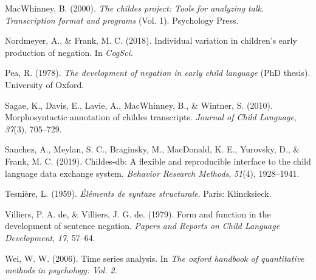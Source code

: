 \documentclass[10pt, letterpaper]{article}
\begin{document}
\leavevmode\hypertarget{ref-macwhinney2000childes}{}%
MacWhinney, B. (2000). \emph{The childes project: Tools for analyzing
talk. Transcription format and programs} (Vol. 1). Psychology Press.

\leavevmode\hypertarget{ref-nordmeyer2018individual}{}%
Nordmeyer, A., \& Frank, M. C. (2018). Individual variation in
children's early production of negation. In \emph{CogSci}.

\leavevmode\hypertarget{ref-pea1978}{}%
Pea, R. (1978). \emph{The development of negation in early child
language} (PhD thesis). University of Oxford.

\leavevmode\hypertarget{ref-sagae2010morphosyntactic}{}%
Sagae, K., Davis, E., Lavie, A., MacWhinney, B., \& Wintner, S. (2010).
Morphosyntactic annotation of childes transcripts. \emph{Journal of
Child Language}, \emph{37}(3), 705--729.

\leavevmode\hypertarget{ref-sanchez2019childes}{}%
Sanchez, A., Meylan, S. C., Braginsky, M., MacDonald, K. E., Yurovsky,
D., \& Frank, M. C. (2019). Childes-db: A flexible and reproducible
interface to the child language data exchange system. \emph{Behavior
Research Methods}, \emph{51}(4), 1928--1941.

\leavevmode\hypertarget{ref-dg}{}%
Tesnière, L. (1959). \emph{Éléments de syntaxe structurale}. Paris:
Klincksieck.

\leavevmode\hypertarget{ref-de1979form}{}%
Villiers, P. A. de, \& Villiers, J. G. de. (1979). Form and function in
the development of sentence negation. \emph{Papers and Reports on Child
Language Development}, \emph{17}, 57--64.

\leavevmode\hypertarget{ref-wei2006time}{}%
Wei, W. W. (2006). Time series analysis. In \emph{The oxford handbook of
quantitative methods in psychology: Vol. 2}.


\end{document}
